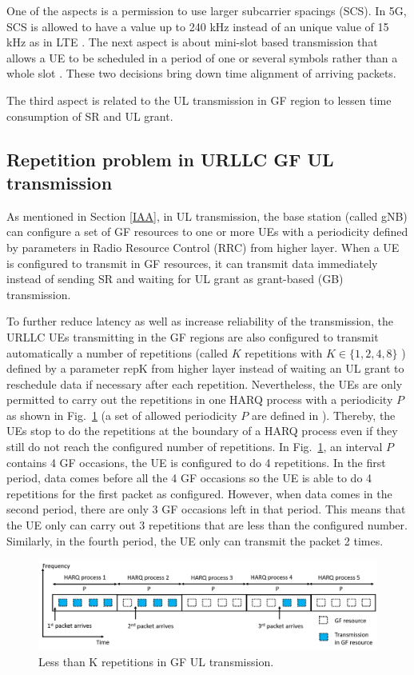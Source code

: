 \documentclass[conference]{IEEEtran}
\begin{document}
One of the aspects is a permission to use larger subcarrier spacings (SCS). In 5G, SCS is allowed to have a value up to 240 kHz instead of an unique value of 15 kHz as in LTE \cite{ad2}. The next aspect is about mini-slot based transmission that allows a UE to be scheduled in a period of one or several symbols rather than a whole slot \cite{ad3}. These two decisions bring down time alignment of arriving packets.

The third aspect is related to the UL transmission in GF region to lessen time consumption of SR and UL grant\cite{ad4}.

\subsection{Repetition problem in URLLC GF UL transmission}\label{IBB}
As mentioned in Section \ref{IAA}, in UL transmission, the base station (called gNB) can configure a set of GF resources to one or more UEs with a periodicity defined by parameters in Radio Resource Control (RRC) from higher layer. When a UE is configured to transmit in GF resources, it can transmit data immediately instead of sending SR and waiting for UL grant as grant-based (GB) transmission.

To further reduce latency as well as increase reliability of the transmission, the URLLC UEs transmitting in the GF regions are also configured to transmit automatically a number of repetitions (called $K$ repetitions with $K \in \{1, 2, 4, 8\}$ \cite{ad5}) defined by a parameter repK from higher layer instead of waiting an UL grant to reschedule data if necessary after each repetition. Nevertheless, the UEs are only permitted to carry out the repetitions in one HARQ process with a periodicity $P$ as shown in Fig.~\ref{fig1} (a set of allowed periodicity $P$ are defined in \cite{ad5}). Thereby, the UEs stop to do the repetitions at the boundary of a HARQ process even if they still do not reach the configured number of repetitions. In Fig.~\ref{fig1}, an interval $P$ contains 4 GF occasions, the UE is configured to do 4 repetitions. In the first period, data comes before all the 4 GF occasions so the UE is able to do 4 repetitions for the first packet as configured. However, when data comes in the second period, there are only 3 GF occasions left in that period. This means that the UE only can carry out 3 repetitions that are less than the configured number. Similarly, in the fourth period, the UE only can transmit the packet 2 times. 
\begin{figure}[htbp]
\centerline{\includegraphics[scale=0.25]{fig1.png}}
\caption{Less than K repetitions in GF UL transmission.}
\label{fig1}
\vspace{-2mm}
\end{figure}
\end{document}
